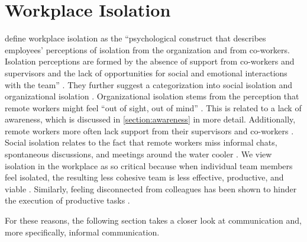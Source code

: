 \section{Workplace Isolation}
\citeauthor{marshall2007workplace} define workplace isolation as the \enquote{psychological construct that describes employees’ perceptions of isolation from the organization and from co-workers. Isolation perceptions are formed by the absence of support from co-workers and supervisors and the lack of opportunities for social and emotional interactions with the team} \autocite[p.~198]{marshall2007workplace}. They further suggest a categorization into social isolation and organizational isolation \autocite{marshall2007workplace}. Organizational isolation stems from the perception that remote workers might feel \enquote{out of sight, out of mind} \autocite{bailey1999advantages}. This is related to a lack of awareness, which is discussed in \autoref{section:awareness} in more detail. Additionally, remote workers more often lack support from their supervisors and co-workers \autocite{marshall2007workplace}. Social isolation relates to the fact that remote workers miss informal chats, spontaneous discussions, and meetings around the water cooler \autocite{cooper2002telecommuting}. We view isolation in the workplace as so critical because when individual team members feel isolated, the resulting less cohesive team is less effective, productive, and viable \autocite{tekleab2009longitudinal, carlson2017virtual}. Similarly, feeling disconnected from colleagues has been shown to hinder the execution of productive tasks \autocite{lostFocus2020}.

For these reasons, the following section takes a closer look at communication and, more specifically, informal communication.

